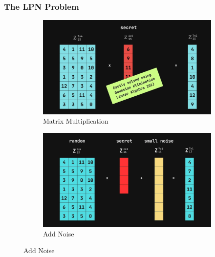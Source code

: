 \documentclass{beamer}
\begin{document}
\begin{frame}
  \frametitle{The LPN Problem}
  \begin{figure}
    \centering
    \begin{subfigure}[b]{0.45\textwidth}
      \includegraphics[width=1\textwidth]{lpn_preq.png}
      \caption{Matrix Multiplication}
      \label{fig:lpn_preq}
    \end{subfigure}
    \hfill
    \begin{subfigure}[b]{0.45\textwidth}
      \includegraphics[width=1\textwidth]{lpn_problem.png}
      \caption{Add Noise}
      \label{fig:lpn_problem}
    \end{subfigure}
  \end{figure}
\end{frame}
\end{document}
